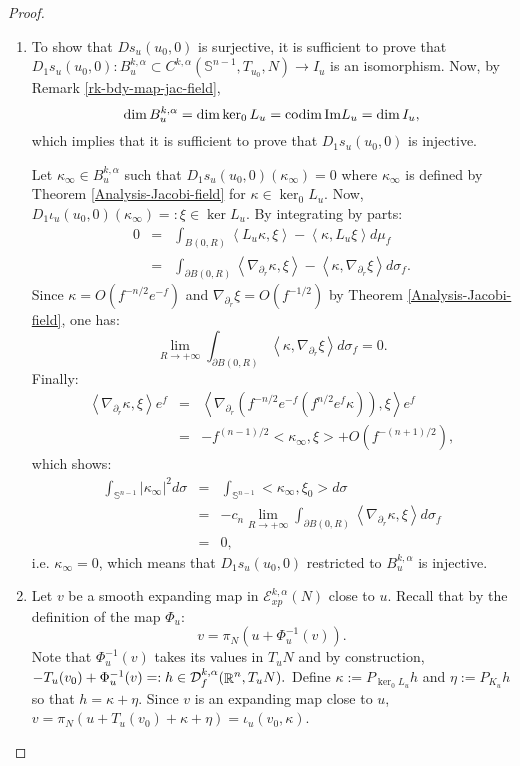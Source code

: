 \documentclass[a4paper,11pt,reqno]{amsart}
\def\dim{\mathop{\rm dim}\nolimits}
\def\codim{\mathop{\rm codim}\nolimits}
\def\dim{\mathop{\rm dim}\nolimits}
\def\codim{\mathop{\rm codim}\nolimits}
\def\R{\mathop{\rm \mathbb{R}}\nolimits}
\newcommand{\Ent}{\mathcal{E}}
\newcommand{\Ima}{\text{Im}}
\begin{document}
\begin{proof}
\begin{enumerate}
\item
To show that $Ds_u(u_0,0)$ is surjective, it is sufficient to prove that $D_1s_u(u_0,0):B_u^{k,\alpha}\subset C^{k,\alpha}(\mathbb{S}^{n-1},T_{u_0},N) \rightarrow I_u$ is an isomorphism. Now, by Remark \ref{rk-bdy-map-jac-field}, $$\dim B_u^{k,\alpha}=\dim \ker_0L_u=\codim \Ima L_u=\dim I_u,$$ which implies that it is sufficient to prove that $D_1s_u(u_0,0)$ is injective.

Let $\kappa_{\infty}\in B_u^{k,\alpha}$ such that $D_1s_u(u_0,0)(\kappa_{\infty})=0$ where $\kappa_{\infty}$ is defined by Theorem \ref{Analysis-Jacobi-field} for $\kappa\in \ker_0L_u$. Now, $D_1\iota_u(u_0,0)(\kappa_{\infty})=:\xi\in\ker L_u$. By integrating by parts:
 \begin{eqnarray*}
0&=&\int_{B(0,R)}\left<L_u\kappa,\xi\right>-\left<\kappa,L_u\xi\right>d\mu_f\\
&=&\int_{\partial B(0,R)}\left<\nabla_{\partial_r}\kappa,\xi\right>-\left<\kappa,\nabla_{\partial_r}\xi\right>d\sigma_f.
\end{eqnarray*} 
Since $\kappa=\textit{O}\left(f^{-n/2}e^{-f}\right)$ and $\nabla_{\partial_r}\xi=\textit{O}(f^{-1/2})$ by Theorem \ref{Analysis-Jacobi-field}, one has:$$\lim_{R\rightarrow +\infty} \int_{\partial B(0,R)}\left<\kappa,\nabla_{\partial_r}\xi\right>d\sigma_f=0.$$
Finally:
\begin{eqnarray*}
\left<\nabla_{\partial_r}\kappa,\xi\right>e^f&=&\left<\nabla_{\partial_r}\left(f^{-n/2}e^{-f}\left(f^{n/2}e^f\kappa\right)\right),\xi\right>e^f\\
&=&-f^{(n-1)/2}<\kappa_{\infty},\xi>+\textit{O}(f^{-(n+1)/2}),
\end{eqnarray*}
which shows:
\begin{eqnarray*}
\int_{\mathbb{S}^{n-1}}|\kappa_{\infty}|^2d\sigma&=&\int_{\mathbb{S}^{n-1}}<\kappa_{\infty},\xi_0>d\sigma\\
&=&-c_n\lim_{R\rightarrow+\infty}\int_{\partial B(0,R)}\left<\nabla_{\partial_r}\kappa,\xi\right>d\sigma_f\\
&=&0,
\end{eqnarray*}
i.e. $\kappa_{\infty}=0$, which means that $D_1s_u(u_0,0)$ restricted to $B_u^{k,\alpha}$ is injective.\\
\item 
Let $v$ be a smooth expanding map in $\Ent_{xp}^{k,\alpha}(N)$ close to $u$. Recall that by the definition of the map $\Phi_u$:  $$v=\pi_N(u+\Phi_u^{-1}(v)).$$ 
Note that $\Phi_u^{-1}(v)$ takes its values in $T_uN$ and by construction, $-T_u(v_0)+\Phi_u^{-1}(v)=:h\in \mathcal{D}_f^{k,\alpha}(\R^n,T_uN).$ Define $\kappa:=P_{\ker_0L_u}h$ and $\eta:= P_{K_u}h$ so that $h=\kappa+\eta$. Since $v$ is an expanding map close to $u$, $v=\pi_N(u+T_u(v_0)+\kappa+\eta)=\iota_u(v_0,\kappa)$.\\

\end{enumerate}
\end{proof}
\end{document}
